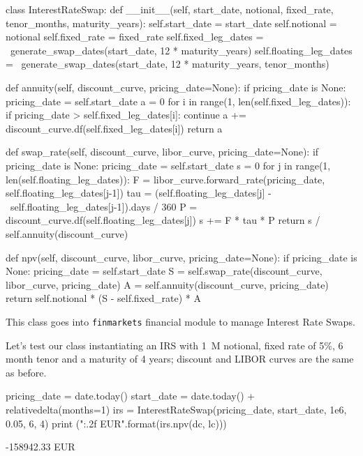\begin{ipython}
class InterestRateSwap:
    def __init__(self, start_date, notional,
                 fixed_rate, tenor_months, maturity_years):
        self.start_date = start_date
        self.notional = notional
        self.fixed_rate = fixed_rate
        self.fixed_leg_dates = \
            generate_swap_dates(start_date, 12 * maturity_years)
        self.floating_leg_dates = \
            generate_swap_dates(start_date, 12 * maturity_years, tenor_months)
    
    def annuity(self, discount_curve, pricing_date=None):
        if pricing_date is None:
            pricing_date = self.start_date
        a = 0
        for i in range(1, len(self.fixed_leg_dates)):
            if pricing_date > self.fixed_leg_dates[i]:
                continue
            a += discount_curve.df(self.fixed_leg_dates[i])
        return a

    def swap_rate(self, discount_curve, libor_curve, pricing_date=None):
        if pricing_date is None:
            pricing_date = self.start_date
        s = 0
        for j in range(1, len(self.floating_leg_dates)):
            F = libor_curve.forward_rate(pricing_date, self.floating_leg_dates[j-1])
            tau = (self.floating_leg_dates[j] - \
                self.floating_leg_dates[j-1]).days / 360 
            P = discount_curve.df(self.floating_leg_dates[j])
            s += F * tau * P
        return s / self.annuity(discount_curve)

    def npv(self, discount_curve, libor_curve, pricing_date=None):
        if pricing_date is None:
            pricing_date = self.start_date
        S = self.swap_rate(discount_curve, libor_curve, pricing_date)
        A = self.annuity(discount_curve, pricing_date)
        return self.notional * (S - self.fixed_rate) * A
\end{ipython}

\begin{finmarkets}
This class goes into \texttt{finmarkets} financial module to manage Interest Rate Swaps.
\end{finmarkets}
Let's test our class instantiating an IRS with 1~M notional, fixed rate
of 5\%, 6 month tenor and a maturity of 4 years; discount and LIBOR
curves are the same as before.

\begin{ipython}
pricing_date = date.today()
start_date = date.today() + relativedelta(months=1)
irs = InterestRateSwap(pricing_date, start_date, 1e6, 0.05, 6, 4)
print ("{:.2f} EUR".format(irs.npv(dc, lc)))
\end{ipython}
\begin{ioutput}
-158942.33 EUR
\end{ioutput}

